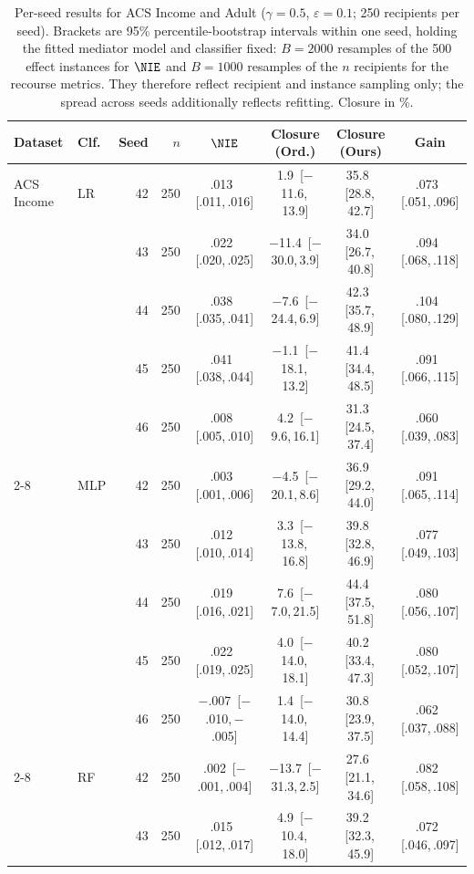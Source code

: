 \begin{table}[t]
\centering
\footnotesize
\caption{Per-seed results for ACS Income and Adult ($\gamma=0.5$,
$\varepsilon=0.1$; 250 recipients per seed). Brackets are 95\% percentile-bootstrap
intervals within one seed, holding the fitted mediator model and classifier
fixed: $B=2000$ resamples of the 500 effect instances for $\NIE$ and $B=1000$
resamples of the $n$ recipients for the recourse metrics. They therefore
reflect recipient and instance sampling only; the spread across seeds
additionally reflects refitting. Closure in \%.}
\label{tab:app_seed_b}
\setlength{\tabcolsep}{3.5pt}
\begin{tabular}{llrr cccc}
\hline
Dataset & Clf. & Seed & $n$ & $\NIE$ & Closure (Ord.) & Closure (Ours) &
Gain \\
\hline
ACS Income & LR & 42 & 250 & .013 \,[.011,\,.016] & 1.9 \,[$-$11.6,\,13.9] & 35.8 \,[28.8,\,42.7] & .073 \,[.051,\,.096] \\
 &  & 43 & 250 & .022 \,[.020,\,.025] & $-$11.4 \,[$-$30.0,\,3.9] & 34.0 \,[26.7,\,40.8] & .094 \,[.068,\,.118] \\
 &  & 44 & 250 & .038 \,[.035,\,.041] & $-$7.6 \,[$-$24.4,\,6.9] & 42.3 \,[35.7,\,48.9] & .104 \,[.080,\,.129] \\
 &  & 45 & 250 & .041 \,[.038,\,.044] & $-$1.1 \,[$-$18.1,\,13.2] & 41.4 \,[34.4,\,48.5] & .091 \,[.066,\,.115] \\
 &  & 46 & 250 & .008 \,[.005,\,.010] & 4.2 \,[$-$9.6,\,16.1] & 31.3 \,[24.5,\,37.4] & .060 \,[.039,\,.083] \\
\cline{2-8}
 & MLP & 42 & 250 & .003 \,[.001,\,.006] & $-$4.5 \,[$-$20.1,\,8.6] & 36.9 \,[29.2,\,44.0] & .091 \,[.065,\,.114] \\
 &  & 43 & 250 & .012 \,[.010,\,.014] & 3.3 \,[$-$13.8,\,16.8] & 39.8 \,[32.8,\,46.9] & .077 \,[.049,\,.103] \\
 &  & 44 & 250 & .019 \,[.016,\,.021] & 7.6 \,[$-$7.0,\,21.5] & 44.4 \,[37.5,\,51.8] & .080 \,[.056,\,.107] \\
 &  & 45 & 250 & .022 \,[.019,\,.025] & 4.0 \,[$-$14.0,\,18.1] & 40.2 \,[33.4,\,47.3] & .080 \,[.052,\,.107] \\
 &  & 46 & 250 & $-$.007 \,[$-$.010,\,$-$.005] & 1.4 \,[$-$14.0,\,14.4] & 30.8 \,[23.9,\,37.5] & .062 \,[.037,\,.088] \\
\cline{2-8}
 & RF & 42 & 250 & .002 \,[$-$.001,\,.004] & $-$13.7 \,[$-$31.3,\,2.5] & 27.6 \,[21.1,\,34.6] & .082 \,[.058,\,.108] \\
 &  & 43 & 250 & .015 \,[.012,\,.017] & 4.9 \,[$-$10.4,\,18.0] & 39.2 \,[32.3,\,45.9] & .072 \,[.046,\,.097] \\

\end{tabular}
\end{table}
